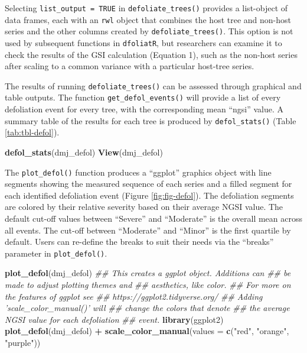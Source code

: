 \documentclass[review]{elsarticle} %
\newenvironment{Shaded}{\begin{snugshade}}{\end{snugshade}}
\newcommand{\CommentTok}[1]{\textcolor[rgb]{0.56,0.35,0.01}{\textit{#1}}}
\newcommand{\DataTypeTok}[1]{\textcolor[rgb]{0.13,0.29,0.53}{#1}}
\newcommand{\KeywordTok}[1]{\textcolor[rgb]{0.13,0.29,0.53}{\textbf{#1}}}
\newcommand{\NormalTok}[1]{#1}
\newcommand{\OperatorTok}[1]{\textcolor[rgb]{0.81,0.36,0.00}{\textbf{#1}}}
\newcommand{\StringTok}[1]{\textcolor[rgb]{0.31,0.60,0.02}{#1}}
\begin{document}
Selecting \texttt{list\_output\ =\ TRUE} in \texttt{defoliate\_trees()} provides a list-object of data frames, each with an \texttt{rwl} object that combines the host tree and non-host series and the other columns created by \texttt{defoliate\_trees()}. This option is not used by subsequent functions in \texttt{dfoliatR}, but researchers can examine it to check the results of the GSI calculation (Equation 1), such as the non-host series after scaling to a common variance with a particular host-tree series.

The results of running \texttt{defoliate\_trees()} can be assessed through graphical and table outputs. The function \texttt{get\_defol\_events()} will provide a list of every defoliation event for every tree, with the corresponding mean ``ngsi'' value. A summary table of the results for each tree is produced by \texttt{defol\_stats()} (Table \ref{tab:tbl-defol}).

\begin{Shaded}
\begin{Highlighting}[]
\KeywordTok{defol_stats}\NormalTok{(dmj_defol)}
\KeywordTok{View}\NormalTok{(dmj_defol)}
\end{Highlighting}
\end{Shaded}

The \texttt{plot\_defol()} function produces a ``ggplot'' graphics object with line segments showing the measured sequence of each series and a filled segment for each identified defoliation event (Figure \ref{fig:fig-defol}). The defoliation segments are colored by their relative severity based on their average NGSI value. The default cut-off values between ``Severe'' and ``Moderate'' is the overall mean across all events. The cut-off between ``Moderate'' and ``Minor'' is the first quartile by default. Users can re-define the breaks to suit their needs via the ``breaks'' parameter in \texttt{plot\_defol()}.

\begin{Shaded}
\begin{Highlighting}[]
\KeywordTok{plot_defol}\NormalTok{(dmj_defol)}
\CommentTok{## This creates a ggplot object. Additions can }
\CommentTok{## be made to adjust plotting themes and}
\CommentTok{## aesthetics, like color.   }
\CommentTok{## For more on the features of ggplot see}
\CommentTok{## https://ggplot2.tidyverse.org/}
\CommentTok{## Adding 'scale_color_manual()' will}
\CommentTok{## change the colors that denote }
\CommentTok{## the average NGSI value for each defoliation}
\CommentTok{## event.}
\KeywordTok{library}\NormalTok{(ggplot2)}
\KeywordTok{plot_defol}\NormalTok{(dmj_defol) }\OperatorTok{+}
\StringTok{  }\KeywordTok{scale_color_manual}\NormalTok{(}\DataTypeTok{values =} \KeywordTok{c}\NormalTok{(}\StringTok{"red"}\NormalTok{, }\StringTok{"orange"}\NormalTok{, }\StringTok{"purple"}\NormalTok{))}
\end{Highlighting}
\end{Shaded}
\end{document}
